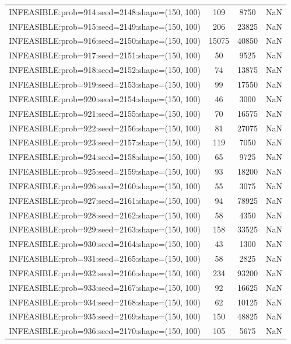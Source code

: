 \begin{longtable}{lccc}
INFEASIBLE:prob=914:seed=2148:shape=(150, 100) &   109 &  8750 &    NaN \\
INFEASIBLE:prob=915:seed=2149:shape=(150, 100) &   206 & 23825 &    NaN \\
INFEASIBLE:prob=916:seed=2150:shape=(150, 100) & 15075 & 40850 &    NaN \\
INFEASIBLE:prob=917:seed=2151:shape=(150, 100) &    50 &  9525 &    NaN \\
INFEASIBLE:prob=918:seed=2152:shape=(150, 100) &    74 & 13875 &    NaN \\
INFEASIBLE:prob=919:seed=2153:shape=(150, 100) &    99 & 17550 &    NaN \\
INFEASIBLE:prob=920:seed=2154:shape=(150, 100) &    46 &  3000 &    NaN \\
INFEASIBLE:prob=921:seed=2155:shape=(150, 100) &    70 & 16575 &    NaN \\
INFEASIBLE:prob=922:seed=2156:shape=(150, 100) &    81 & 27075 &    NaN \\
INFEASIBLE:prob=923:seed=2157:shape=(150, 100) &   119 &  7050 &    NaN \\
INFEASIBLE:prob=924:seed=2158:shape=(150, 100) &    65 &  9725 &    NaN \\
INFEASIBLE:prob=925:seed=2159:shape=(150, 100) &    93 & 18200 &    NaN \\
INFEASIBLE:prob=926:seed=2160:shape=(150, 100) &    55 &  3075 &    NaN \\
INFEASIBLE:prob=927:seed=2161:shape=(150, 100) &    94 & 78925 &    NaN \\
INFEASIBLE:prob=928:seed=2162:shape=(150, 100) &    58 &  4350 &    NaN \\
INFEASIBLE:prob=929:seed=2163:shape=(150, 100) &   158 & 33525 &    NaN \\
INFEASIBLE:prob=930:seed=2164:shape=(150, 100) &    43 &  1300 &    NaN \\
INFEASIBLE:prob=931:seed=2165:shape=(150, 100) &    58 &  2825 &    NaN \\
INFEASIBLE:prob=932:seed=2166:shape=(150, 100) &   234 & 93200 &    NaN \\
INFEASIBLE:prob=933:seed=2167:shape=(150, 100) &    92 & 16625 &    NaN \\
INFEASIBLE:prob=934:seed=2168:shape=(150, 100) &    62 & 10125 &    NaN \\
INFEASIBLE:prob=935:seed=2169:shape=(150, 100) &   150 & 48825 &    NaN \\
INFEASIBLE:prob=936:seed=2170:shape=(150, 100) &   105 &  5675 &    NaN \\

\end{longtable}
